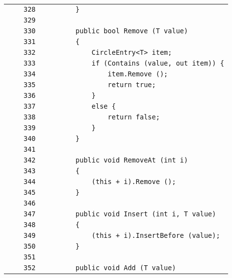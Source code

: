 \documentclass[a4paper,10pt]{article}
\begin{document}
\begin{longtable}[l]{lrrl}
\cellcolor{gray} &  & \verb~328~ & \verb~        }~\\
\cellcolor{gray} &  & \verb~329~ & \verb~~\\
\cellcolor{gray} &  & \verb~330~ & \verb~        public bool Remove (T value)~\\
\cellcolor{gray} &  & \verb~331~ & \verb~        {~\\
\cellcolor{gray} &  & \verb~332~ & \verb~            CircleEntry<T> item;~\\
\cellcolor{gray} &  & \verb~333~ & \verb~            if (Contains (value, out item)) {~\\
\cellcolor{gray} &  & \verb~334~ & \verb~                item.Remove ();~\\
\cellcolor{gray} &  & \verb~335~ & \verb~                return true;~\\
\cellcolor{gray} &  & \verb~336~ & \verb~            }~\\
\cellcolor{gray} &  & \verb~337~ & \verb~            else {~\\
\cellcolor{gray} &  & \verb~338~ & \verb~                return false;~\\
\cellcolor{gray} &  & \verb~339~ & \verb~            }~\\
\cellcolor{gray} &  & \verb~340~ & \verb~        }~\\
\cellcolor{gray} &  & \verb~341~ & \verb~~\\
\cellcolor{gray} &  & \verb~342~ & \verb~        public void RemoveAt (int i)~\\
\cellcolor{gray} &  & \verb~343~ & \verb~        {~\\
\cellcolor{gray} &  & \verb~344~ & \verb~            (this + i).Remove ();~\\
\cellcolor{gray} &  & \verb~345~ & \verb~        }~\\
\cellcolor{gray} &  & \verb~346~ & \verb~~\\
\cellcolor{gray} &  & \verb~347~ & \verb~        public void Insert (int i, T value)~\\
\cellcolor{gray} &  & \verb~348~ & \verb~        {~\\
\cellcolor{gray} &  & \verb~349~ & \verb~            (this + i).InsertBefore (value);~\\
\cellcolor{gray} &  & \verb~350~ & \verb~        }~\\
\cellcolor{gray} &  & \verb~351~ & \verb~~\\
\cellcolor{gray} &  & \verb~352~ & \verb~        public void Add (T value)~\\

\end{longtable}
\end{document}
